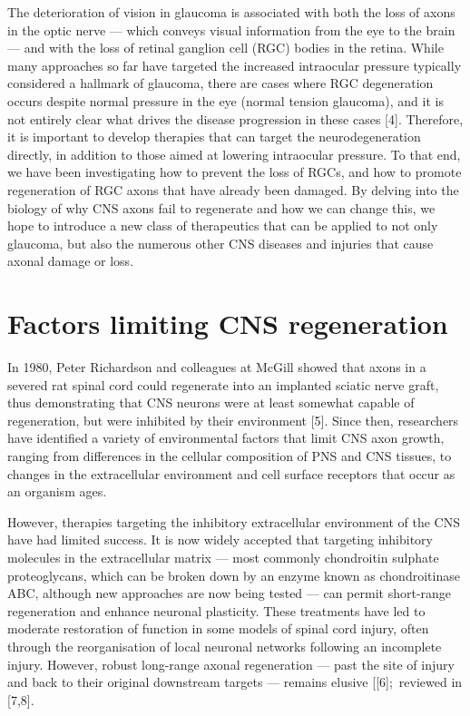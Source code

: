 \documentclass[
  12pt,
  a4paper,
]{book}
\begin{document}
The deterioration of vision in glaucoma is associated with both the loss of axons in the optic nerve --- which conveys visual information from the eye to the brain --- and with the loss of retinal ganglion cell (RGC) bodies in the retina. While many approaches so far have targeted the increased intraocular pressure typically considered a hallmark of glaucoma, there are cases where RGC degeneration occurs despite normal pressure in the eye (normal tension glaucoma), and it is not entirely clear what drives the disease progression in these cases {[}4{]}. Therefore, it is important to develop therapies that can target the neurodegeneration directly, in addition to those aimed at lowering intraocular pressure. To that end, we have been investigating how to prevent the loss of RGCs, and how to promote regeneration of RGC axons that have already been damaged. By delving into the biology of why CNS axons fail to regenerate and how we can change this, we hope to introduce a new class of therapeutics that can be applied to not only glaucoma, but also the numerous other CNS diseases and injuries that cause axonal damage or loss.

\hypertarget{factors-limiting-cns-regeneration}{%
\section{Factors limiting CNS regeneration}\label{factors-limiting-cns-regeneration}}

In 1980, Peter Richardson and colleagues at McGill showed that axons in a severed rat spinal cord could regenerate into an implanted sciatic nerve graft, thus demonstrating that CNS neurons were at least somewhat capable of regeneration, but were inhibited by their environment {[}5{]}. Since then, researchers have identified a variety of environmental factors that limit CNS axon growth, ranging from differences in the cellular composition of PNS and CNS tissues, to changes in the extracellular environment and cell surface receptors that occur as an organism ages.

However, therapies targeting the inhibitory extracellular environment of the CNS have had limited success. It is now widely accepted that targeting inhibitory molecules in the extracellular matrix --- most commonly chondroitin sulphate proteoglycans, which can be broken down by an enzyme known as chondroitinase ABC, although new approaches are now being tested --- can permit short-range regeneration and enhance neuronal plasticity. These treatments have led to moderate restoration of function in some models of spinal cord injury, often through the reorganisation of local neuronal networks following an incomplete injury. However, robust long-range axonal regeneration --- past the site of injury and back to their original downstream targets --- remains elusive {[}{[}6{]};~reviewed in {[}7,8{]}.
\end{document}

